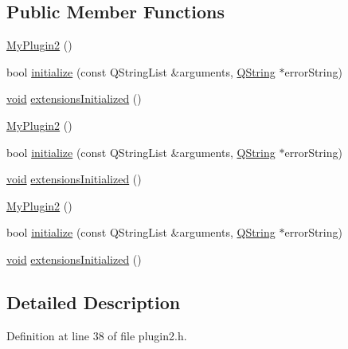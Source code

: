 \subsection*{\-Public \-Member \-Functions}
\begin{DoxyCompactItemize}
\item 
\hyperlink{class_plugin2_1_1_my_plugin2_a5c22d36752f6536ba52762d59868b8dc}{\-My\-Plugin2} ()
\item 
bool \hyperlink{class_plugin2_1_1_my_plugin2_a07363358acc9f69b85d01098a5651001}{initialize} (const \-Q\-String\-List \&arguments, \hyperlink{group___u_a_v_objects_plugin_gab9d252f49c333c94a72f97ce3105a32d}{\-Q\-String} $\ast$error\-String)
\item 
\hyperlink{group___u_a_v_objects_plugin_ga444cf2ff3f0ecbe028adce838d373f5c}{void} \hyperlink{class_plugin2_1_1_my_plugin2_af7d34ae6f055b086ad23af98ffedc641}{extensions\-Initialized} ()
\item 
\hyperlink{class_plugin2_1_1_my_plugin2_a448298d79c5c8340ee73e9e111f8f36e}{\-My\-Plugin2} ()
\item 
bool \hyperlink{class_plugin2_1_1_my_plugin2_a916f4fbb7e5464477ce2dcdaa416d286}{initialize} (const \-Q\-String\-List \&arguments, \hyperlink{group___u_a_v_objects_plugin_gab9d252f49c333c94a72f97ce3105a32d}{\-Q\-String} $\ast$error\-String)
\item 
\hyperlink{group___u_a_v_objects_plugin_ga444cf2ff3f0ecbe028adce838d373f5c}{void} \hyperlink{class_plugin2_1_1_my_plugin2_a9c07bb7d949169532e7a1ba2cdccdf49}{extensions\-Initialized} ()
\item 
\hyperlink{class_plugin2_1_1_my_plugin2_a448298d79c5c8340ee73e9e111f8f36e}{\-My\-Plugin2} ()
\item 
bool \hyperlink{class_plugin2_1_1_my_plugin2_a916f4fbb7e5464477ce2dcdaa416d286}{initialize} (const \-Q\-String\-List \&arguments, \hyperlink{group___u_a_v_objects_plugin_gab9d252f49c333c94a72f97ce3105a32d}{\-Q\-String} $\ast$error\-String)
\item 
\hyperlink{group___u_a_v_objects_plugin_ga444cf2ff3f0ecbe028adce838d373f5c}{void} \hyperlink{class_plugin2_1_1_my_plugin2_a9c07bb7d949169532e7a1ba2cdccdf49}{extensions\-Initialized} ()
\end{DoxyCompactItemize}


\subsection{\-Detailed \-Description}


\-Definition at line 38 of file plugin2.\-h.




